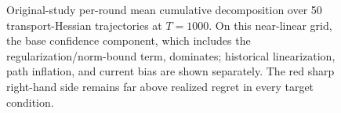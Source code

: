 \begin{figure}[p]
  \centering
  
  \caption{Original-study per-round mean cumulative decomposition over 50 transport-Hessian
  trajectories at $T=1000$.  On this near-linear grid, the base confidence component,
  which includes the regularization/norm-bound term, dominates; historical linearization, path
  inflation, and current bias are shown separately.  The red sharp right-hand
  side remains far above realized regret in every target condition.}
  \label{fig:transport-instantiation-bound}
\end{figure}
\clearpage
